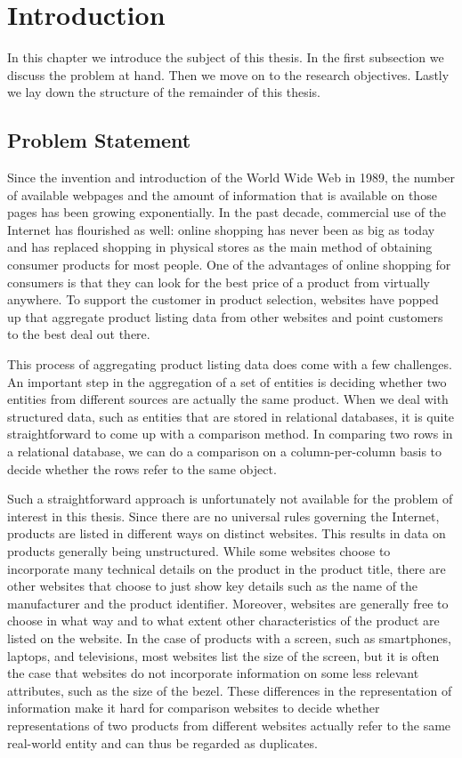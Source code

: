 \chapter{Introduction}\label{chap:introduction}
In this chapter we introduce the subject of this thesis. In the first subsection we discuss the problem at hand. Then we move on to the research objectives. Lastly we lay down the structure of the remainder of this thesis. 
\section{Problem Statement}
\label{sect:problem_statement}
Since the invention and introduction of the World Wide Web in 1989, the number of available webpages and the amount of information that is available on those pages has been growing exponentially. In the past decade, commercial use of the Internet has flourished as well: online shopping has never been as big as today and has replaced shopping in physical stores as the main method of obtaining consumer products for most people. One of the advantages of online shopping for consumers is that they can look for the best price of a product from virtually anywhere. To support the customer in product selection, websites have popped up that aggregate product listing data from other websites and point customers to the best deal out there. 

This process of aggregating product listing data does come with a few challenges. An important step in the aggregation of a set of entities is deciding whether two entities from different sources are actually the same product. When we deal with structured data, such as entities that are stored in relational databases, it is quite straightforward to come up with a comparison method. In comparing two rows in a relational database, we can do a comparison on a column-per-column basis to decide whether the rows refer to the same object. 

Such a straightforward approach is unfortunately not available for the problem of interest in this thesis. Since there are no universal rules governing the Internet, products are listed in different ways on distinct websites. This results in data on products generally being unstructured. While some websites choose to incorporate many technical details on the product in the product title, there are other websites that choose to just show key details such as the name of the manufacturer and the product identifier. Moreover, websites are generally free to choose in what way and to what extent other characteristics of the product are listed on the website. In the case of products with a screen, such as smartphones, laptops, and televisions, most websites  list the size of the screen, but it is often the case that websites do not incorporate information on some less relevant attributes, such as the size of the bezel. These differences in the representation of information make it hard for comparison websites to decide whether representations of two products from different websites actually refer to the same real-world entity and can thus be regarded as duplicates.

